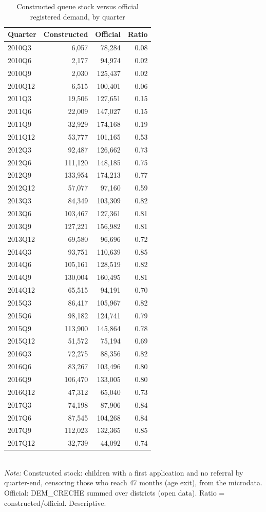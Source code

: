 \begin{table}[htbp]\centering
\caption{Constructed queue stock versus official registered demand, by quarter}
\label{tab:C2_estoque_vs_oficial}
\small
\setlength{\tabcolsep}{4pt}
\begin{tabular}{lrrr}
\toprule
Quarter & Constructed & Official & Ratio \\
\midrule
2010Q3 & 6,057 & 78,284 & 0.08 \\
2010Q6 & 2,177 & 94,974 & 0.02 \\
2010Q9 & 2,030 & 125,437 & 0.02 \\
2010Q12 & 6,515 & 100,401 & 0.06 \\
2011Q3 & 19,506 & 127,651 & 0.15 \\
2011Q6 & 22,009 & 147,027 & 0.15 \\
2011Q9 & 32,929 & 174,168 & 0.19 \\
2011Q12 & 53,777 & 101,165 & 0.53 \\
2012Q3 & 92,487 & 126,662 & 0.73 \\
2012Q6 & 111,120 & 148,185 & 0.75 \\
2012Q9 & 133,954 & 174,213 & 0.77 \\
2012Q12 & 57,077 & 97,160 & 0.59 \\
2013Q3 & 84,349 & 103,309 & 0.82 \\
2013Q6 & 103,467 & 127,361 & 0.81 \\
2013Q9 & 127,221 & 156,982 & 0.81 \\
2013Q12 & 69,580 & 96,696 & 0.72 \\
2014Q3 & 93,751 & 110,639 & 0.85 \\
2014Q6 & 105,161 & 128,519 & 0.82 \\
2014Q9 & 130,004 & 160,495 & 0.81 \\
2014Q12 & 65,515 & 94,191 & 0.70 \\
2015Q3 & 86,417 & 105,967 & 0.82 \\
2015Q6 & 98,182 & 124,741 & 0.79 \\
2015Q9 & 113,900 & 145,864 & 0.78 \\
2015Q12 & 51,572 & 75,194 & 0.69 \\
2016Q3 & 72,275 & 88,356 & 0.82 \\
2016Q6 & 83,267 & 103,496 & 0.80 \\
2016Q9 & 106,470 & 133,005 & 0.80 \\
2016Q12 & 47,312 & 65,040 & 0.73 \\
2017Q3 & 74,198 & 87,906 & 0.84 \\
2017Q6 & 87,545 & 104,268 & 0.84 \\
2017Q9 & 112,023 & 132,365 & 0.85 \\
2017Q12 & 32,739 & 44,092 & 0.74 \\
\bottomrule
\end{tabular}
\\[3pt]{\footnotesize \textit{Note:} Constructed stock: children with a first application and no referral by quarter-end, censoring those who reach 47 months (age exit), from the microdata. Official: DEM\_CRECHE summed over districts (open data). Ratio = constructed/official. Descriptive.}
\end{table}
